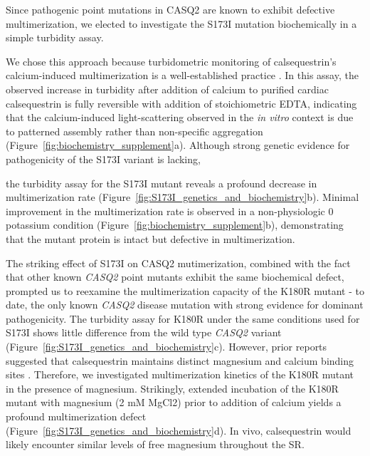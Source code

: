 Since pathogenic point mutations in CASQ2 are known to exhibit defective multimerization, we elected to investigate the S173I mutation biochemically in a simple turbidity assay. 
\begin{hlbreakable}
We chose this approach because turbidometric monitoring of calsequestrin's calcium-induced multimerization is a well-established practice \cite{Bal2010-vf}\cite{Bal2011-tv}. In this assay, the observed increase in turbidity after addition of calcium to purified cardiac calsequestrin is fully reversible with addition of stoichiometric EDTA, indicating that the calcium-induced light-scattering observed in the \textit{in vitro} context is due to patterned assembly rather than non-specific aggregation (Figure~\ref{fig:biochemistry_supplement}a). Although strong genetic evidence for pathogenicity of the S173I variant is lacking, 
\end{hlbreakable}
the turbidity assay for the S173I mutant reveals a profound decrease in multimerization rate (Figure~\ref{fig:S173I_genetics_and_biochemistry}b). Minimal improvement in the multimerization rate is observed in a non-physiologic \SI{0}{\milli\Molar} potassium condition (Figure~\ref{fig:biochemistry_supplement}b), demonstrating that the mutant protein is intact but defective in multimerization.  

The striking effect of S173I on CASQ2 mutimerization, combined with the fact that other known \textit{CASQ2} point mutants exhibit the same biochemical defect, prompted us to reexamine the multimerization capacity of the K180R mutant - to date, the only known \textit{CASQ2} disease mutation with strong evidence for dominant pathogenicity. The turbidity assay for K180R under the same conditions used for S173I shows little difference from the wild type \textit{CASQ2} variant (Figure~\ref{fig:S173I_genetics_and_biochemistry}c). However, prior reports suggested that calsequestrin maintains distinct magnesium and calcium binding sites \cite{Krause1991-le}. Therefore, we investigated multimerization kinetics of the K180R mutant in the presence of magnesium. Strikingly, extended incubation of the K180R mutant with magnesium (2 mM MgCl2) prior to addition of calcium yields a profound multimerization defect (Figure~\ref{fig:S173I_genetics_and_biochemistry}d). In vivo, calsequestrin would likely encounter similar levels of free magnesium throughout the SR. 

